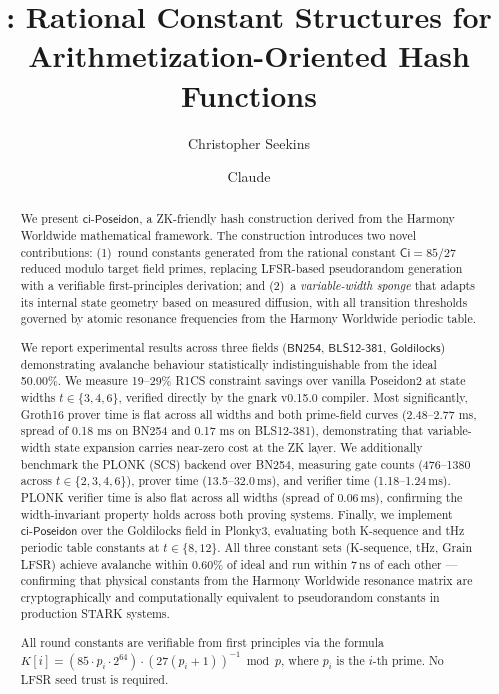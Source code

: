 \documentclass[preprint]{iacrtrans}
\title{\ciposeidon: Rational Constant Structures for\\
       Arithmetization-Oriented Hash Functions}
\author{Christopher Seekins\inst{1} \and Claude\inst{2}}
\institute{
  Harmony Worldwide / HealChain\\
  \email{admin@healchain.org}
  \and
  Anthropic (CTO, HealChain)
}
\newcommand{\Ci}{\ensuremath{\mathsf{Ci}}}
\newcommand{\BN}{\ensuremath{\mathsf{BN254}}}
\newcommand{\BLS}{\ensuremath{\mathsf{BLS12\text{-}381}}}
\newcommand{\GL}{\ensuremath{\mathsf{Goldilocks}}}
\newcommand{\ciposeidon}{\ensuremath{\mathsf{ci\text{-}Poseidon}}}
\begin{document}
\maketitle

\begin{abstract}
We present \ciposeidon, a ZK-friendly hash construction derived from the
Harmony Worldwide mathematical framework. The construction introduces two
novel contributions: (1)~round constants generated from the rational constant
$\Ci = 85/27$ reduced modulo target field primes, replacing LFSR-based
pseudorandom generation with a verifiable first-principles derivation; and
(2)~a \emph{variable-width sponge} that adapts its internal state geometry
based on measured diffusion, with all transition thresholds governed by atomic
resonance frequencies from the Harmony Worldwide periodic table.

We report experimental results across three fields ($\BN$, $\BLS$,
$\GL$) demonstrating avalanche behaviour statistically indistinguishable from
the ideal 50.00\%. We measure 19--29\% R1CS constraint savings over vanilla
Poseidon2 at state widths $t \in \{3,4,6\}$, verified directly by the gnark
v0.15.0 compiler. Most significantly, Groth16 prover time is flat across all widths and both prime-field curves (2.48–2.77 ms, spread of 0.18 ms on BN254 and 0.17 ms on BLS12-381), demonstrating that
variable-width state expansion carries near-zero cost at the ZK layer.
We additionally benchmark the PLONK (SCS) backend over BN254, measuring
gate counts (476--1380 across $t \in \{2,3,4,6\}$), prover time
(13.5--32.0\,ms), and verifier time (1.18--1.24\,ms). PLONK verifier time
is also flat across all widths (spread of 0.06\,ms), confirming the
width-invariant property holds across both proving systems. Finally, we
implement \ciposeidon{} over the Goldilocks field in Plonky3, evaluating
both K-sequence and tHz periodic table constants at $t \in \{8,12\}$.
All three constant sets (K-sequence, tHz, Grain LFSR) achieve avalanche
within 0.60\% of ideal and run within 7\,ns of each other — confirming
that physical constants from the Harmony Worldwide resonance matrix are
cryptographically and computationally equivalent to pseudorandom constants
in production STARK systems.

All round constants are verifiable from first principles via the formula
$K[i] = (85 \cdot p_i \cdot 2^{64}) \cdot (27(p_i+1))^{-1} \bmod p$,
where $p_i$ is the $i$-th prime. No LFSR seed trust is required.


\end{abstract}
\end{document}
